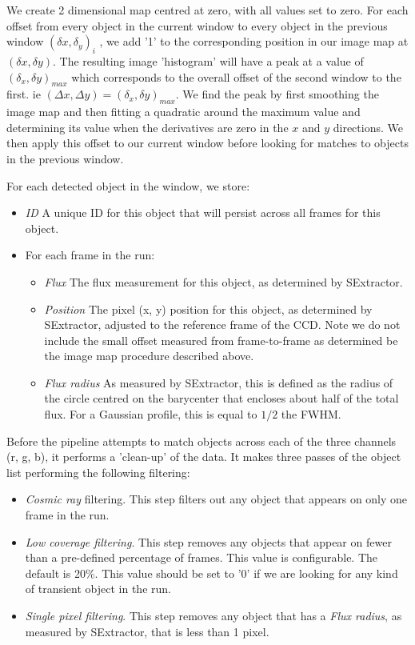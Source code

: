We create 2 dimensional map centred at zero, with all values set to zero. For each offset from every object in the current window to every object in the previous window $(\delta x, \delta_y)_i$ , we add '1' to the corresponding position in our image map at $(\delta x, \delta y)$. The resulting image 'histogram' will have a peak at a value of $(\delta_x, \delta y)_{max}$ which corresponds to the overall offset of the second window to the first. ie $(\Delta x, \Delta y) = (\delta_x, \delta y)_{max}$. We find the peak by first smoothing the image map and then fitting a quadratic around the maximum value and determining its value when the derivatives are zero in the $x$ and $y$ directions. We then apply this offset to our current window before looking for matches to objects in the previous window.

For each detected object in the window, we store: 
\begin{itemize}
  \item \emph{ID} A unique ID for this object that will persist across all frames for this object.
  \item For each frame in the run:
  \begin{itemize}
    \item \emph{Flux} The flux measurement for this object, as determined by SExtractor.
    \item \emph{Position} The pixel (x, y) position for this object, as determined by SExtractor, adjusted to the reference frame of the CCD. Note we do not include the small offset measured from frame-to-frame as determined be the image map procedure described above. 
    \item \emph{Flux radius} As measured by SExtractor, this is defined as the radius of the circle centred on the barycenter that encloses about half of the total flux. For a Gaussian profile, this is equal to $1/2$ the FWHM. 
  \end{itemize}
\end{itemize}

Before the pipeline attempts to match objects across each of the three channels (r, g, b), it performs a 'clean-up' of the data. It makes three passes of the object list performing the following filtering:

\begin{itemize}
  \item \emph{Cosmic ray} filtering. This step filters out any object that appears on only one frame in the run. 
  \item \emph{Low coverage filtering}. This step removes any objects that appear on fewer than a pre-defined percentage of frames. This value is configurable. The default is 20\%. This value should be set to '0' if we are looking for any kind of transient object in the run. 
  \item \emph{Single pixel filtering}. This step removes any object that has a \emph{Flux radius}, as measured by SExtractor, that is less than 1 pixel.
\end{itemize}


